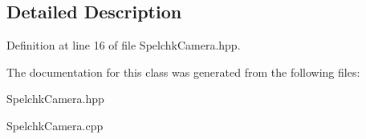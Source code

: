 \subsection{Detailed Description}


Definition at line 16 of file Spelchk\-Camera.\-hpp.



The documentation for this class was generated from the following files\-:\begin{DoxyCompactItemize}
\item 
Spelchk\-Camera.\-hpp\item 
Spelchk\-Camera.\-cpp\end{DoxyCompactItemize}
